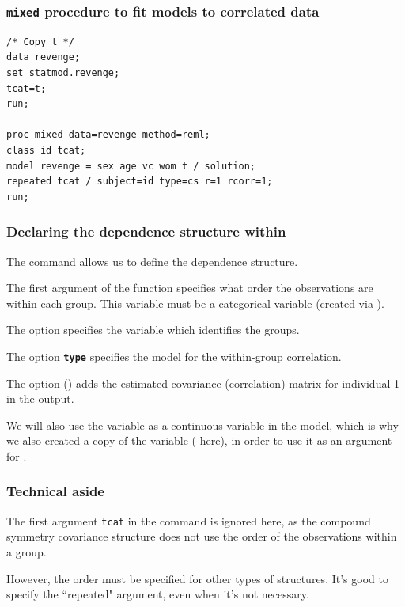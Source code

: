 \documentclass{beamer}
\begin{document}
 \begin{frame}[fragile]
\frametitle{\texttt{mixed} procedure to fit models to correlated data}
\begin{tcolorbox}[colback=white, colframe=hecblue, title=\SASlang{} code ]
\begin{verbatim}
/* Copy t */
data revenge; 
set statmod.revenge; 
tcat=t; 
run;

proc mixed data=revenge method=reml; 
class id tcat; 
model revenge = sex age vc wom t / solution; 
repeated tcat / subject=id type=cs r=1 rcorr=1; 
run;
\end{verbatim}
\end{tcolorbox}

\end{frame}
% 


 \begin{frame}[fragile]
\frametitle{Declaring the dependence structure within }
The command  allows us to define the dependence structure.
\bi
\item The first argument of the  function specifies what order the observations are within each group. This variable must be a categorical variable (created via ). 
\item The option  specifies the variable which identifies the groups. 
\item  The option \texttt{\textbf{type}} specifies the model for the within-group correlation.
\item The option  () adds the estimated covariance (correlation) matrix for individual 1 in the output.
\ei 
{\footnotesize  We will also use the variable  as a continuous variable in the model, which is why we also created a copy of the variable  ( here), in order to use it as an argument for  . 

}

\end{frame}
\begin{frame}[fragile]
\frametitle{Technical aside}
\bi
\item The first argument \texttt{tcat} in the \textbf{} command is ignored here, as the compound symmetry covariance structure does not use the order of the observations within a group.
\item However, the order must be specified for other types of structures. It's good to specify the ``repeated" argument, even when it's not necessary.
\ei
\end{frame}
\end{document}

